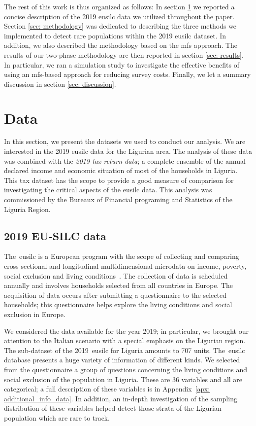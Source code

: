 The rest of this work is thus organized as follows: In section \ref{sec: data} we reported a concise description of the 2019 \gls{eusilc} data we utilized throughout the paper.
Section \ref{sec: methodology} was dedicated to describing the three methods we implemented to detect rare populations within the 2019 \gls{eusilc} dataset.
In addition, we also described the methodology based on the \gls{mfs} approach.
The results of our two-phase methodology are then reported in section \ref{sec: results}.
In particular, we ran a simulation study to investigate the effective benefits of using an \gls{mfs}-based approach for reducing survey costs.
Finally, we let a summary discussion in section \ref{sec: discussion}.

\section{Data}\label{sec: data}
In this section, we present the datasets we used to conduct our analysis.
We are interested in the 2019 \gls{eusilc} data for the Ligurian area.
The analysis of these data was combined with the \textit{2019 tax return data}; a complete ensemble of the annual declared income and economic situation of most of the households in Liguria. 
This tax dataset has the scope to provide a good measure of comparison for investigating the critical aspects of the \gls{eusilc} data. This analysis was commissioned by the Bureaux of Financial programing and Statistics of the Liguria Region. 

\subsection{2019 EU-SILC data}\label{sec: data_eusilc}
The~\gls{eusilc} is a European program with the scope of collecting and comparing cross-sectional and longitudinal multidimensional microdata on income, poverty, social exclusion and living conditions~\cite[]{EUSILC:2019}.
The collection of data is scheduled annually and involves households selected from all countries in Europe.
The acquisition of data occurs after submitting a questionnaire to the selected households; this questionnaire helps explore the living conditions and social exclusion in Europe.

We considered the data available for the year 2019; in particular, we brought our attention to the Italian scenario with a special emphasis on the Ligurian region. 
The sub-dataset of the 2019~\gls{eusilc} for Liguria amounts to 707 units.
The~\gls{eusilc} database presents a huge variety of information of different kinds. 
We selected from the questionnaire a group of questions concerning the living conditions and social exclusion of the population in Liguria.
These are 36 variables and all are categorical; a full description of these variables is in Appendix~\ref{apx: additional_info_data}.
In addition, an in-depth investigation of the sampling distribution of these variables helped detect those strata of the Ligurian population which are rare to track.


